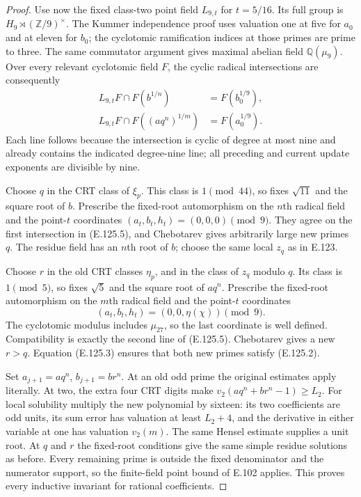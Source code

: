\begin{proof}
Use now the fixed class-two point field $L_{9,t}$ for
$t=5/16$. Its full group is $H_9\rtimes(\mathbb Z/9)^\times$.
The Kummer independence proof uses valuation one at five
for $a_0$ and at eleven for $b_0$; the cyclotomic ramification
indices at those primes are prime to three. The same
commutator argument gives maximal abelian field
$\mathbb Q(\mu_9)$. Over every relevant cyclotomic field
$F$, the cyclic radical intersections are consequently
\[
 \begin{split}
 L_{9,t}F\cap F(b^{1/n})&=F(b_0^{1/9}),\\
 L_{9,t}F\cap F((aq^n)^{1/m})&=F(a_0^{1/9}).
 \end{split}
 \tag{E.125.5}
\]
Each line follows because the intersection is cyclic of
degree at most nine and already contains the indicated
degree-nine line; all preceding and current update exponents
are divisible by nine.

Choose $q$ in the CRT class of $\xi_p$. This class is
$1\pmod{44}$, so fixes $\sqrt{11}$ and the square root
of $b$. Prescribe the fixed-root automorphism on the
$n$th radical field and the point-$t$ coordinates
$(a_t,b_t,h_t)=(0,0,0)\pmod9$. They agree on the first
intersection in (E.125.5), and Chebotarev gives arbitrarily
large new primes $q$. The residue field has an $n$th root
of $b$; choose the same local $z_q$ as in E.123.

Choose $r$ in the old CRT classes $\eta_p$, and in the
class of $z_q$ modulo $q$. Its class is $1\pmod5$, so
fixes $\sqrt5$ and the square root of $aq^n$. Prescribe
the fixed-root automorphism on the $m$th radical field and
the point-$t$ coordinates
\[
              (a_t,b_t,h_t)=(0,0,\eta(\chi))\pmod9.
\]
The cyclotomic modulus includes $\mu_{27}$, so the last
coordinate is well defined. Compatibility is exactly the
second line of (E.125.5). Chebotarev gives a new $r>q$.
Equation (E.125.3) ensures that both new primes satisfy
(E.125.2).

Set $a_{j+1}=a q^n$, $b_{j+1}=b r^n$.
At an old odd prime the original estimates apply literally.
At two, the extra four CRT digits make
$v_2(aq^n+br^n-1)\geq L_2$. For local solubility multiply
the new polynomial by sixteen: its two coefficients are
odd units, its sum error has valuation at least $L_2+4$,
and the derivative in either variable at one has valuation
$v_2(m)$. The same Hensel estimate supplies a unit root.
At $q$ and $r$ the fixed-root conditions give the same
simple residue solutions as before. Every remaining prime
is outside the fixed denominator and the numerator support,
so the finite-field point bound of E.102 applies. This
proves every inductive invariant for rational coefficients.


\end{proof}
